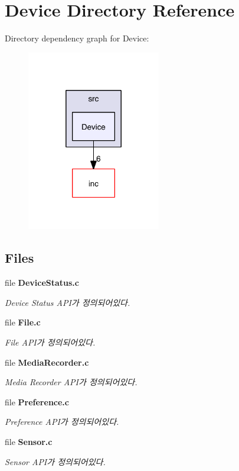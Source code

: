 \section{Device Directory Reference}
\label{dir_57214c2eadffd92c3463393f4cd1de64}
Directory dependency graph for Device\-:\nopagebreak
\begin{figure}[H]
\begin{center}
\leavevmode
\includegraphics[width=166pt]{dir_57214c2eadffd92c3463393f4cd1de64_dep}
\end{center}
\end{figure}
\subsection*{Files}
\begin{DoxyCompactItemize}
\item 
file {\bf Device\-Status.\-c}
\begin{DoxyCompactList}\small\item\em Device Status A\-P\-I가 정의되어있다. \end{DoxyCompactList}\item 
file {\bf File.\-c}
\begin{DoxyCompactList}\small\item\em File A\-P\-I가 정의되어있다. \end{DoxyCompactList}\item 
file {\bf Media\-Recorder.\-c}
\begin{DoxyCompactList}\small\item\em Media Recorder A\-P\-I가 정의되어있다. \end{DoxyCompactList}\item 
file {\bf Preference.\-c}
\begin{DoxyCompactList}\small\item\em Preference A\-P\-I가 정의되어있다. \end{DoxyCompactList}\item 
file {\bf Sensor.\-c}
\begin{DoxyCompactList}\small\item\em Sensor A\-P\-I가 정의되어있다. \end{DoxyCompactList}\end{DoxyCompactItemize}
